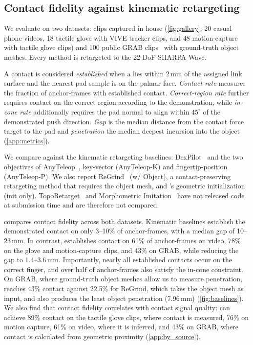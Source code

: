 \subsection{Contact fidelity against kinematic retargeting}
\label{sec:exp:setup}

 We evaluate on two datasets: clips captured in house (\cref{fig:gallery}: 20 casual phone videos, 18 tactile glove with VIVE tracker clips, and 48 motion-capture with tactile glove clips) and 100 public GRAB clips~\citep{grab} with ground-truth object meshes. Every method is retargeted to the 22-DoF SHARPA Wave.

 A contact is considered \emph{established} when a \fcas lies within 2\,mm of the assigned link surface and the nearest pad sample is on the palmar face. \emph{Contact rate} measures the fraction of anchor-frames with established contact. \emph{Correct-region rate} further requires contact on the correct region according to the demonstration, while \emph{in-cone rate} additionally requires the pad normal to align within $45^\circ$ of the demonstrated push direction. \emph{Gap} is the median distance from the contact force target to the pad and \emph{penetration} the median deepest incursion into the object (\cref{app:metrics}).

 We compare against the kinematic retargeting baselines: DexPilot~\citep{dexpilot} and the two objectives of AnyTeleop~\citep{anyteleop}, key-vector (AnyTeleop-K) and fingertip-position (AnyTeleop-P). We also report ReGrind~\citep{regrind} (w/ Object), a contact-preserving retargeting method that requires the object mesh, and \ours's geometric initialization (init only). TopoRetarget~\citep{toporetarget} and Morphometric Imitation~\citep{morphometric} have not released code at submission time and are therefore not compared.

  compares contact fidelity across both datasets. Kinematic baselines establish the demonstrated contact on only 3--10\% of anchor-frames, with a median gap of 10--23\,mm. In contrast, \ours establishes contact on 61\% of anchor-frames on video, 78\% on the glove and motion-capture clips, and 43\% on GRAB, while reducing the gap to 1.4--3.6\,mm. Importantly, nearly all established contacts occur on the correct finger, and over half of anchor-frames also satisfy the in-cone constraint. On GRAB, where ground-truth object meshes allow us to measure penetration, \ours reaches 43\% contact against 22.5\% for ReGrind, which takes the object mesh as input, and also produces the least object penetration (7.96\,mm) (\cref{fig:baselines}). We also find that contact fidelity correlates with contact signal quality: \ours can achieve 89\% contact on the tactile glove clips, where contact is measured, 76\% on motion capture, 61\% on video, where it is inferred, and 43\% on GRAB, where contact is calculated from geometric proximity (\cref{app:by_source}).

